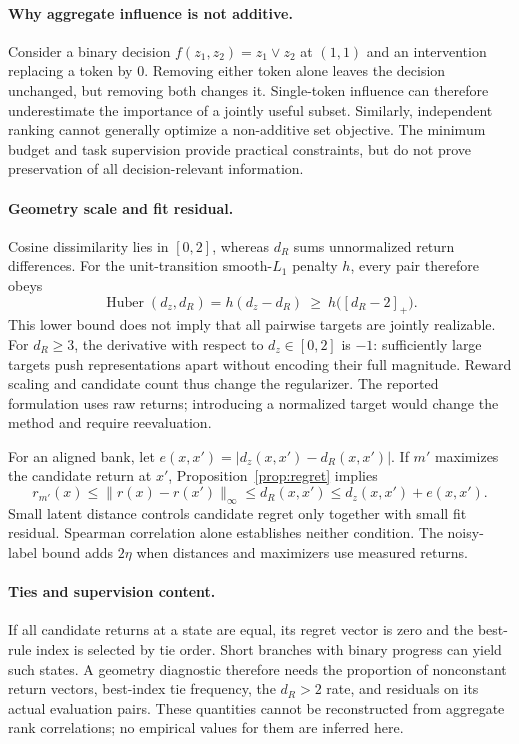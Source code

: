 \documentclass{article}
\newcommand{\Huber}{\operatorname{Huber}}
\begin{document}
\paragraph{Why aggregate influence is not additive.}
Consider a binary decision $f(z_1,z_2)=z_1\lor z_2$ at $(1,1)$ and an intervention replacing a token by 0. Removing either token alone leaves the decision unchanged, but removing both changes it. Single-token influence can therefore underestimate the importance of a jointly useful subset. Similarly, independent ranking cannot generally optimize a non-additive set objective. The minimum budget and task supervision provide practical constraints, but do not prove preservation of all decision-relevant information.

\paragraph{Geometry scale and fit residual.}
Cosine dissimilarity lies in $[0,2]$, whereas $d_R$ sums unnormalized return differences. For the unit-transition smooth-$L_1$ penalty $h$, every pair therefore obeys
\begin{equation}
\Huber(d_z,d_R)=h(d_z-d_R)\ \geq\ h\big([d_R-2]_+\big).
\end{equation}
This lower bound does not imply that all pairwise targets are jointly realizable. For $d_R\geq3$, the derivative with respect to $d_z\in[0,2]$ is $-1$: sufficiently large targets push representations apart without encoding their full magnitude. Reward scaling and candidate count thus change the regularizer. The reported formulation uses raw returns; introducing a normalized target would change the method and require reevaluation.

For an aligned bank, let $e(x,x')=|d_z(x,x')-d_R(x,x')|$. If $m'$ maximizes the candidate return at $x'$, Proposition~\ref{prop:regret} implies
\begin{equation}
 r_{m'}(x)\leq\|r(x)-r(x')\|_\infty
 \leq d_R(x,x')\leq d_z(x,x')+e(x,x').
\end{equation}
Small latent distance controls candidate regret only together with small fit residual. Spearman correlation alone establishes neither condition. The noisy-label bound adds $2\eta$ when distances and maximizers use measured returns.

\paragraph{Ties and supervision content.}
If all candidate returns at a state are equal, its regret vector is zero and the best-rule index is selected by tie order. Short branches with binary progress can yield such states. A geometry diagnostic therefore needs the proportion of nonconstant return vectors, best-index tie frequency, the $d_R>2$ rate, and residuals on its actual evaluation pairs. These quantities cannot be reconstructed from aggregate rank correlations; no empirical values for them are inferred here.
\end{document}
